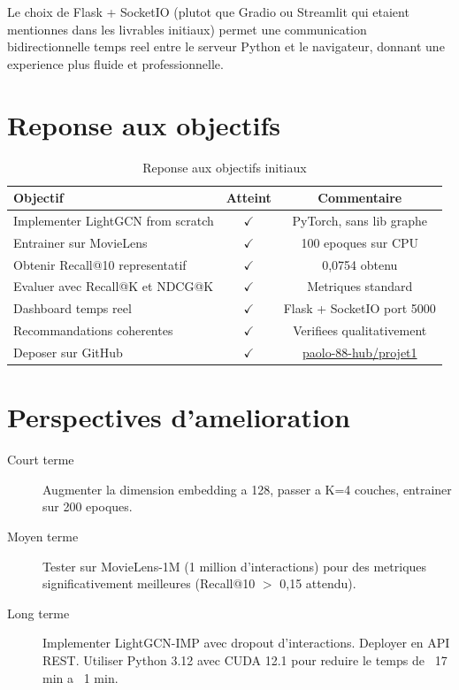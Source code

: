 \documentclass[12pt,a4paper]{report}
\begin{document}
Le choix de Flask + SocketIO (plutot que Gradio ou
Streamlit qui etaient mentionnes dans les livrables
initiaux) permet une communication bidirectionnelle
temps reel entre le serveur Python et le navigateur,
donnant une experience plus fluide et professionnelle.

\section{Reponse aux objectifs}

\begin{table}[H]
\centering
\caption{Reponse aux objectifs initiaux}
\begin{tabular}{lcc}
\toprule
\textbf{Objectif} & \textbf{Atteint} & \textbf{Commentaire} \\
\midrule
Implementer LightGCN from scratch &
  $\checkmark$ & PyTorch, sans lib graphe \\
Entrainer sur MovieLens &
  $\checkmark$ & 100 epoques sur CPU \\
Obtenir Recall@10 representatif &
  $\checkmark$ & 0,0754 obtenu \\
Evaluer avec Recall@K et NDCG@K &
  $\checkmark$ & Metriques standard \\
Dashboard temps reel &
  $\checkmark$ & Flask + SocketIO port 5000 \\
Recommandations coherentes &
  $\checkmark$ & Verifiees qualitativement \\
Deposer sur GitHub &
  $\checkmark$ & \href{https://github.com/paolo-88-hub/projet1-lightgcn-AIA-4}{paolo-88-hub/projet1} \\
\bottomrule
\end{tabular}
\end{table}

\section{Perspectives d'amelioration}

\begin{description}
  \item[Court terme] Augmenter la dimension embedding a 128,
    passer a K=4 couches, entrainer sur 200 epoques.

  \item[Moyen terme] Tester sur MovieLens-1M (1 million
    d'interactions) pour des metriques significativement
    meilleures (Recall@10 $>$ 0,15 attendu).

  \item[Long terme] Implementer LightGCN-IMP avec dropout
    d'interactions. Deployer en API REST. Utiliser Python 3.12
    avec CUDA 12.1 pour reduire le temps de ~17 min a ~1 min.
\end{description}
\end{document}
